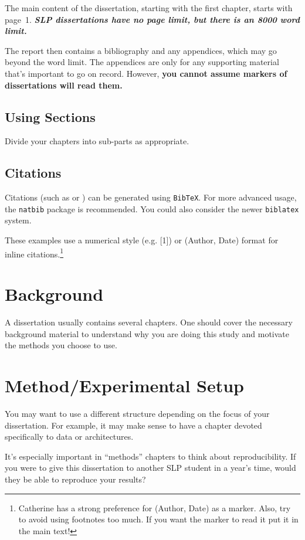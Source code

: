 \documentclass[msc,deptreport,slp]{infthesis} %
\begin{document}
The main content of the dissertation, starting with the first chapter,
starts with page~1. \emph{\textbf{SLP dissertations have no page limit, but there is an 8000 word limit.}}

The report then contains a bibliography and any appendices, which may go beyond
the word limit. The appendices are only for any supporting material that's important to
go on record. However, \textbf{you cannot assume markers of dissertations will read them.}



\section{Using Sections}

Divide your chapters into sub-parts as appropriate.

\section{Citations}

Citations (such as \cite{P1} or \cite{P2}) can be generated using
\texttt{BibTeX}. For more advanced usage, the \texttt{natbib} package is
recommended. You could also consider the newer \texttt{biblatex} system.

These examples use a numerical style  (e.g. [1]) or 
(Author, Date) format for inline citations.\footnote{Catherine has a strong preference for (Author, Date) as a marker.  Also, try to avoid using footnotes too much. If you want the marker to read it put it in the main text!}

\chapter{Background}

A dissertation usually contains several chapters.  One should cover the necessary background material to understand why you are doing this study and motivate the methods you choose to use. 

\chapter{Method/Experimental Setup}

You may want to use a different structure depending on the focus of your dissertation. For example, it may make sense to have a chapter devoted specifically to data or architectures.  

It's especially important in ``methods'' chapters to think about reproducibility. If you were to give this dissertation to another SLP student in a year's time, would they be able to reproduce your results? 
\end{document}
